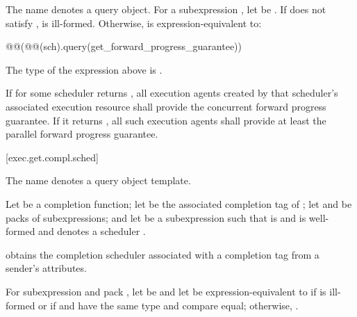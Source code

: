 \pnum
The name  denotes a query object.
For a subexpression , let  be .
If  does not satisfy ,
 is ill-formed.
Otherwise,
 is expression-equivalent to:
\begin{codeblock}
@@(@@(sch).query(get_forward_progress_guarantee))
\end{codeblock}

\mandates
The type of the expression above is .

\pnum
If  for some scheduler 
returns ,
all execution agents created by that scheduler's associated execution resource
shall provide the concurrent forward progress guarantee.
If it returns ,
all such execution agents
shall provide at least the parallel forward progress guarantee.

[exec.get.compl.sched]{}

\pnum
The name  denotes a query object template.

\pnum
Let  be a completion function;
let  be
the associated completion tag of ;
let  and  be packs of subexpressions; and
let  be a subexpression
such that  is  and
is well-formed and denotes a scheduler .

\pnum
{} obtains
the completion scheduler associated with a completion tag
from a sender's attributes.

\pnum
For subexpression  and pack ,
let  be
 and
let  be
expression-equivalent to 
if  is ill-formed or
if  and  have the same type and compare equal;
otherwise, .

